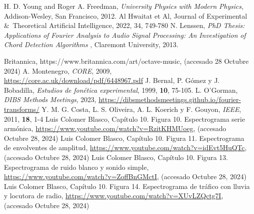 \documentclass[12pt, letterpaper]{article}
\begin{document}
\begin{thebibliography}{9}
  H. D. Young and Roger A. Freedman, \emph{University Physics with Modern Physics}, 
  Addison-Wesley, San Francisco, 2012. %
  Al Hwaitat et Al, Journal of Experimental \&\ Theoretical Artificial Intelligence,
  2022, 34, 749-780
  N. Lenssen, \emph{PhD Thesis: Applications of Fourier Analysis to Audio Signal Processing: An Investigation of Chord Detection Algorithms
  }, Claremont University, 2013.

  Britannica, https://www.britannica.com/art/octave-music, (accesado 28 Octubre 2024)
  A. Montenegro, \textit{CORE}, 2009, \url{https://core.ac.uk/download/pdf/6448967.pdf}
  J. Bernal, P. Gómez y J. Bobadilla, \textit{Estudios de fonética experimental}, 1999, \textbf{10}, 75-105.
  L. O'Gorman, \textit{DIBS Methods Meetings}, 2023, \url{https://dibsmethodsmeetings.github.io/fourier-transforms/}
  Y. M. G. Costa, L. S. Oliveira, A. L. Koerich y F. Gouyon, \textit{IEEE}, 2011,
  \textbf{18}, 1-4
  Luis Colomer Blasco, Capítulo 10. Figura 10. Espectrograma serie armónica,
  \url{https://www.youtube.com/watch?v=RzitKHMUoeg}, (accesado Octubre 28, 2024)
  Luis Colomer Blasco, Capítulo 10. Figura 11. Espectrograma de envolventes de amplitud,
  \url{https://www.youtube.com/watch?v=idEvt5HuQTc}, (accesado Octubre 28, 2024)
  Luis Colomer Blasco, Capítulo 10. Figura 13. Espectrograma de ruido blanco y sonido simple,
  \url{https://www.youtube.com/watch?v=ZoffBnGMctI}, (accesado Octubre 28, 2024)
  Luis Colomer Blasco, Capítulo 10. Figura 14. Espectrograma de tráfico con lluvia y locutora de radio,
  \url{https://www.youtube.com/watch?v=XUvLZQctg7I}, (accesado Octubre 28, 2024)
\end{thebibliography}
\end{document}
